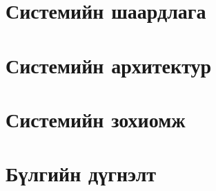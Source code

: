 \section{Системийн шаардлага}


\section{Системийн архитектур}


\section{Системийн зохиомж}


\section{Бүлгийн дүгнэлт}

